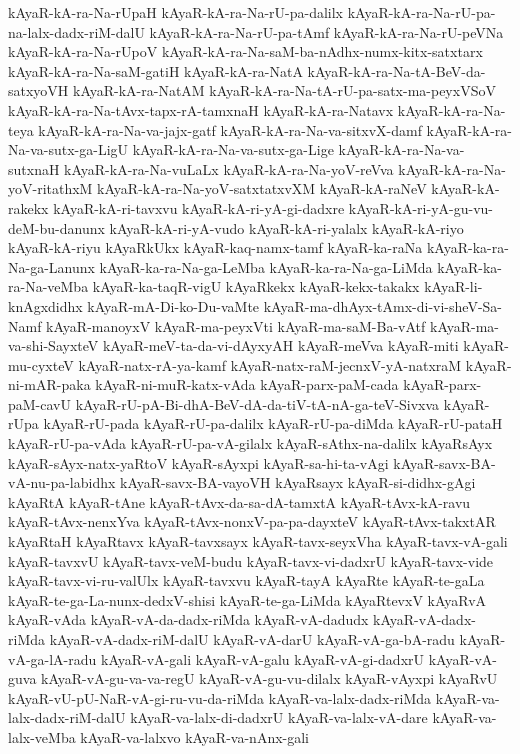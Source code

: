{kAyaR-kA-ra-Na-rUpaH
kAyaR-kA-ra-Na-rU-pa-dalilx
kAyaR-kA-ra-Na-rU-pa-na-lalx-dadx-riM-dalU
kAyaR-kA-ra-Na-rU-pa-tAmf
kAyaR-kA-ra-Na-rU-peVNa
kAyaR-kA-ra-Na-rUpoV
kAyaR-kA-ra-Na-saM-ba-nAdhx-numx-kitx-satxtarx
kAyaR-kA-ra-Na-saM-gatiH
kAyaR-kA-ra-NatA
kAyaR-kA-ra-Na-tA-BeV-da-satxyoVH
kAyaR-kA-ra-NatAM
kAyaR-kA-ra-Na-tA-rU-pa-satx-ma-peyxVSoV
kAyaR-kA-ra-Na-tAvx-tapx-rA-tamxnaH
kAyaR-kA-ra-Natavx
kAyaR-kA-ra-Na-teya
kAyaR-kA-ra-Na-va-jajx-gatf
kAyaR-kA-ra-Na-va-sitxvX-damf
kAyaR-kA-ra-Na-va-sutx-ga-LigU
kAyaR-kA-ra-Na-va-sutx-ga-Lige
kAyaR-kA-ra-Na-va-sutxnaH
kAyaR-kA-ra-Na-vuLaLx
kAyaR-kA-ra-Na-yoV-reVva
kAyaR-kA-ra-Na-yoV-ritathxM
kAyaR-kA-ra-Na-yoV-satxtatxvXM
kAyaR-kA-raNeV
kAyaR-kA-rakekx
kAyaR-kA-ri-tavxvu
kAyaR-kA-ri-yA-gi-dadxre
kAyaR-kA-ri-yA-gu-vu-deM-bu-danunx
kAyaR-kA-ri-yA-vudo
kAyaR-kA-ri-yalalx
kAyaR-kA-riyo
kAyaR-kA-riyu
kAyaRkUkx
kAyaR-kaq-namx-tamf
kAyaR-ka-raNa
kAyaR-ka-ra-Na-ga-Lanunx
kAyaR-ka-ra-Na-ga-LeMba
kAyaR-ka-ra-Na-ga-LiMda
kAyaR-ka-ra-Na-veMba
kAyaR-ka-taqR-vigU
kAyaRkekx
kAyaR-kekx-takakx
kAyaR-li-knAgxdidhx
kAyaR-mA-Di-ko-Du-vaMte
kAyaR-ma-dhAyx-tAmx-di-vi-sheV-Sa-Namf
kAyaR-manoyxV
kAyaR-ma-peyxVti
kAyaR-ma-saM-Ba-vAtf
kAyaR-ma-va-shi-SayxteV
kAyaR-meV-ta-da-vi-dAyxyAH
kAyaR-meVva
kAyaR-miti
kAyaR-mu-cyxteV
kAyaR-natx-rA-ya-kamf
kAyaR-natx-raM-jecnxV-yA-natxraM
kAyaR-ni-mAR-paka
kAyaR-ni-muR-katx-vAda
kAyaR-parx-paM-cada
kAyaR-parx-paM-cavU
kAyaR-rU-pA-Bi-dhA-BeV-dA-da-tiV-tA-nA-ga-teV-Sivxva
kAyaR-rUpa
kAyaR-rU-pada
kAyaR-rU-pa-dalilx
kAyaR-rU-pa-diMda
kAyaR-rU-pataH
kAyaR-rU-pa-vAda
kAyaR-rU-pa-vA-gilalx
kAyaR-sAthx-na-dalilx
kAyaRsAyx
kAyaR-sAyx-natx-yaRtoV
kAyaR-sAyxpi
kAyaR-sa-hi-ta-vAgi
kAyaR-savx-BA-vA-nu-pa-labidhx
kAyaR-savx-BA-vayoVH
kAyaRsayx
kAyaR-si-didhx-gAgi
kAyaRtA
kAyaR-tAne
kAyaR-tAvx-da-sa-dA-tamxtA
kAyaR-tAvx-kA-ravu
kAyaR-tAvx-nenxYva
kAyaR-tAvx-nonxV-pa-pa-dayxteV
kAyaR-tAvx-takxtAR
kAyaRtaH
kAyaRtavx
kAyaR-tavxsayx
kAyaR-tavx-seyxVha
kAyaR-tavx-vA-gali
kAyaR-tavxvU
kAyaR-tavx-veM-budu
kAyaR-tavx-vi-dadxrU
kAyaR-tavx-vide
kAyaR-tavx-vi-ru-valUlx
kAyaR-tavxvu
kAyaR-tayA
kAyaRte
kAyaR-te-gaLa
kAyaR-te-ga-La-nunx-dedxV-shisi
kAyaR-te-ga-LiMda
kAyaRtevxV
kAyaRvA
kAyaR-vAda
kAyaR-vA-da-dadx-riMda
kAyaR-vA-dadudx
kAyaR-vA-dadx-riMda
kAyaR-vA-dadx-riM-dalU
kAyaR-vA-darU
kAyaR-vA-ga-bA-radu
kAyaR-vA-ga-lA-radu
kAyaR-vA-gali
kAyaR-vA-galu
kAyaR-vA-gi-dadxrU
kAyaR-vA-guva
kAyaR-vA-gu-va-va-regU
kAyaR-vA-gu-vu-dilalx
kAyaR-vAyxpi
kAyaRvU
kAyaR-vU-pU-NaR-vA-gi-ru-vu-da-riMda
kAyaR-va-lalx-dadx-riMda
kAyaR-va-lalx-dadx-riM-dalU
kAyaR-va-lalx-di-dadxrU
kAyaR-va-lalx-vA-dare
kAyaR-va-lalx-veMba
kAyaR-va-lalxvo
kAyaR-va-nAnx-gali
}
